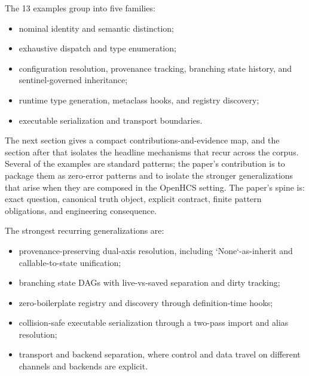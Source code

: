 The 13 examples group into five families:

\begin{itemize}[leftmargin=1.25em]
\item nominal identity and semantic distinction;
\item exhaustive dispatch and type enumeration;
\item configuration resolution, provenance tracking, branching state history, and sentinel-governed inheritance;
\item runtime type generation, metaclass hooks, and registry discovery;
\item executable serialization and transport boundaries.
\end{itemize}

The next section gives a compact contributions-and-evidence map, and the section after that isolates the headline mechanisms that recur across the corpus. Several of the examples are standard patterns; the paper's contribution is to package them as zero-error patterns and to isolate the stronger generalizations that arise when they are composed in the OpenHCS setting. The paper's spine is: exact question, canonical truth object, explicit contract, finite pattern obligations, and engineering consequence.

The strongest recurring generalizations are:

\begin{itemize}[leftmargin=1.25em]
\item provenance-preserving dual-axis resolution, including `None`-as-inherit and callable-to-state unification;
\item branching state DAGs with live-vs-saved separation and dirty tracking;
\item zero-boilerplate registry and discovery through definition-time hooks;
\item collision-safe executable serialization through a two-pass import and alias resolution;
\item transport and backend separation, where control and data travel on different channels and backends are explicit.
\end{itemize}
